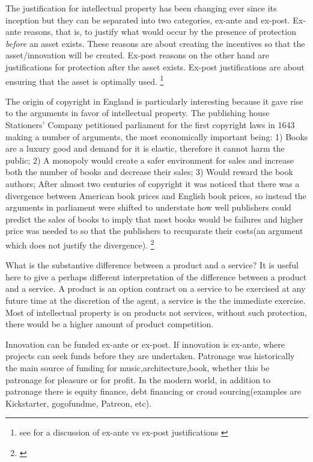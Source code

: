 \documentclass[12pt]{article}
\numberwithin{equation}{section}
\begin{document}

The justification for intellectual property has been changing ever since its inception but they can be separated into two categories, ex-ante and ex-post. Ex-ante reasons, that is, to justify what would occur by the presence of protection \textit{before} an asset exists. These reasons are about creating the incentives so that the asset/innovation will be created. Ex-post reasons on the other hand are justifications for protection after the asset exists. Ex-post justifications are about ensuring that the asset is optimally used. \footnote{see for a discussion of ex-ante vs ex-post justifications \cite{Lemleyt2004}}


The origin of copyright in England is particularly interesting because it gave rise to the arguments in favor of intellectual property. The publishing house Stationers' Company petitioned parliament for the first copyright laws in 1643 making a number of arguments, the most economically important being: 1) Books are a luxury good and demand for it is elastic, therefore it cannot harm the public; 2) A monopoly would create a safer environment for sales and increase both the number of books and decrease their sales; 3) Would reward the book authors; After almost two centuries of copyright it was noticed that there was a divergence between American book prices and English book prices, so instead the arguments in parliament were shifted to understate how well publishers could predict the sales of books to imply that most books would be failures and higher price was needed to so that the publishers to recuparate their costs(an argument which does not justify the divergence). \footnote{\cite{Plant1934}}


What is the substantive difference between a product and a service? It is useful here to give a perhaps different interpretation of the difference between a product and a service. A product is an option contract on a service to be exercised at any future time at the discretion of the agent, a service is the the immediate exercise. Most of intellectual property is on products not services, without such protection, there would be a higher amount of product competition. 


Innovation can be funded ex-ante or ex-post. If innovation is ex-ante, where projects can seek funds before they are undertaken. Patronage was historically the main source of funding for music,architecture,book, whether this be patronage for pleasure or for profit. In the modern world, in addition to patronage there is equity finance, debt financing or croud sourcing(examples are Kickstarter, gogofundme, Patreon, etc). 
\end{document}
